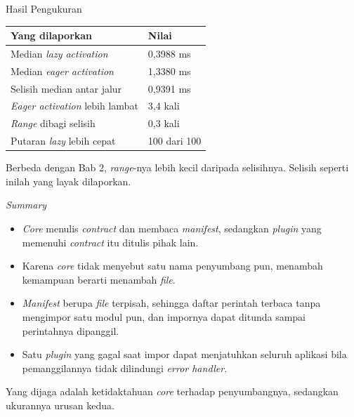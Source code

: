 \documentclass[aspectratio=169, table, 12pt]{beamer}
\begin{document}
\begin{frame}{{\Large Hasil Pengukuran}}
  \vspace{8pt}
  \centering
  \small
  \begin{tabularx}{0.9\textwidth}{|X|l|}
    \hline
    \textbf{Yang dilaporkan} & \textbf{Nilai} \\
    \hline
    Median \textit{lazy activation} & 0,3988 ms \\
    \hline
    Median \textit{eager activation} & 1,3380 ms \\
    \hline
    Selisih median antar jalur & 0,9391 ms \\
    \hline
    \textit{Eager activation} lebih lambat & 3,4 kali \\
    \hline
    \textit{Range} dibagi selisih & 0,3 kali \\
    \hline
    Putaran \textit{lazy} lebih cepat & 100 dari 100 \\
    \hline
  \end{tabularx}

  \vspace{8pt}
  {\small Berbeda dengan Bab 2, \textit{range}-nya lebih kecil daripada
  selisihnya. Selisih seperti inilah yang layak dilaporkan.}
\end{frame}

\begin{frame}{{\Large \textit{Summary}}}
  \vspace{10pt}
  \begin{itemize}\small
    \item \textit{Core} menulis \textit{contract} dan membaca \textit{manifest},
          sedangkan \textit{plugin} yang memenuhi \textit{contract} itu ditulis
          pihak lain.
    \item Karena \textit{core} tidak menyebut satu nama penyumbang pun, menambah
          kemampuan berarti menambah \textit{file}.
    \item \textit{Manifest} berupa \textit{file} terpisah, sehingga daftar perintah
          terbaca tanpa mengimpor satu modul pun, dan impornya dapat ditunda
          sampai perintahnya dipanggil.
    \item Satu \textit{plugin} yang gagal saat impor dapat menjatuhkan seluruh
          aplikasi bila pemanggilannya tidak dilindungi \textit{error handler}.
  \end{itemize}

  \vspace{10pt}
  {\small Yang dijaga adalah ketidaktahuan \textit{core} terhadap penyumbangnya,
  sedangkan ukurannya urusan kedua.}
\end{frame}
\end{document}
